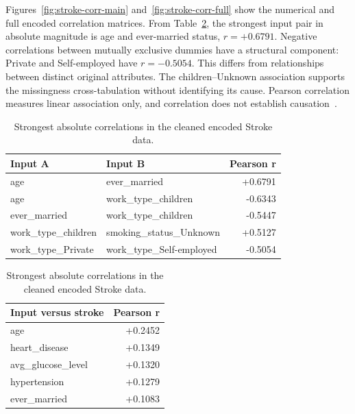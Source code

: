 \documentclass[12pt, a4paper]{article}
\begin{document}
Figures~\ref{fig:stroke-corr-main} and~\ref{fig:stroke-corr-full} show the numerical and full encoded correlation matrices. From Table~\ref{tab:stroke-correlations}, the strongest input pair in absolute magnitude is age and ever-married status, $r=+0.6791$. Negative correlations between mutually exclusive dummies have a structural component: Private and Self-employed have $r=-0.5054$. This differs from relationships between distinct original attributes. The children--Unknown association supports the missingness cross-tabulation without identifying its cause. Pearson correlation measures linear association only, and correlation does not establish causation~\cite{dm25}.
\begin{table}[htbp]
\centering\small
\setlength{\tabcolsep}{4pt}\renewcommand{\arraystretch}{1.12}
\caption{Strongest absolute correlations in the cleaned encoded Stroke data.}
\label{tab:stroke-correlations}
\begin{tabular}{p{.38\linewidth}p{.38\linewidth}r}
\toprule
\raggedright \textbf{Input A} & \raggedright \textbf{Input B} & \textbf{Pearson r} \tabularnewline
\midrule
\raggedright age & \raggedright ever\_married & +0.6791 \tabularnewline
\raggedright age & \raggedright work\_type\_children & -0.6343 \tabularnewline
\raggedright ever\_married & \raggedright work\_type\_children & -0.5447 \tabularnewline
\raggedright work\_type\_children & \raggedright smoking\_status\_Unknown & +0.5127 \tabularnewline
\raggedright work\_type\_Private & \raggedright work\_type\_Self-employed & -0.5054 \tabularnewline
\bottomrule
\end{tabular}
\par\medskip
\begin{tabular}{p{.65\linewidth}r}
\toprule
\raggedright \textbf{Input versus stroke} & \textbf{Pearson r} \tabularnewline
\midrule
\raggedright age & +0.2452 \tabularnewline
\raggedright heart\_disease & +0.1349 \tabularnewline
\raggedright avg\_glucose\_level & +0.1320 \tabularnewline
\raggedright hypertension & +0.1279 \tabularnewline
\raggedright ever\_married & +0.1083 \tabularnewline
\bottomrule
\end{tabular}
\par{}
\end{table}
\end{document}
